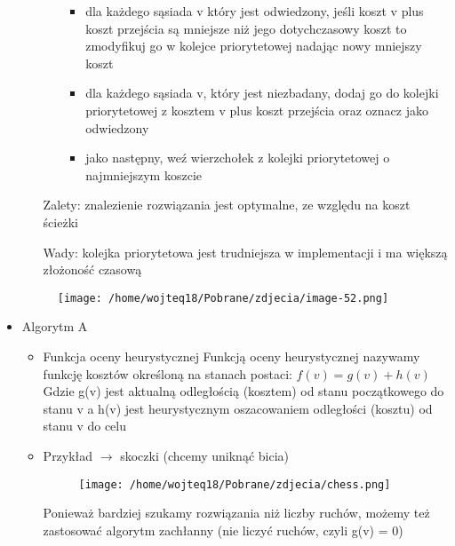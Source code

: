 \documentclass{article}
\begin{document}
\begin{itemize}
\begin{itemize}
\begin{itemize}
\begin{itemize}
                            \item dla każdego sąsiada v który jest odwiedzony, jeśli koszt v plus koszt przejścia są mniejsze niż jego dotychczasowy koszt
                            to zmodyfikuj go w kolejce priorytetowej nadając nowy mniejszy koszt
                            \item dla każdego sąsiada v, który jest niezbadany, dodaj go do kolejki priorytetowej z kosztem v plus koszt przejścia oraz oznacz jako odwiedzony
                            \item jako następny, weź wierzchołek z kolejki priorytetowej o najmniejszym koszcie
                        \end{itemize}
                \end{itemize}
                Zalety: znalezienie rozwiązania jest optymalne, ze względu na koszt ścieżki \par
                Wady: kolejka priorytetowa jest trudniejsza w implementacji i ma większą złożoność czasową
        \end{itemize}
        \begin{figure}[H]
            \centering
            \texttt{[image: /home/wojteq18/Pobrane/zdjecia/image-52.png]}
            \label{fig:dfs_image}
        \end{figure}
    \item Algorytm A
        \begin{itemize}
            \item Funkcja oceny heurystycznej
            Funkcją oceny heurystycznej nazywamy funkcję kosztów określoną na stanach postaci: \newline
            $f(v) = g(v) + h(v)$ \newline
            Gdzie g(v) jest aktualną odległością (kosztem) od stanu początkowego do stanu v \newline
            a h(v) jest heurystycznym oszacowaniem odległości (kosztu) od stanu v do celu
            \item Przykład $\rightarrow$ skoczki (chcemy uniknąć bicia)
            \begin{figure}[H]
                \centering
                \texttt{[image: /home/wojteq18/Pobrane/zdjecia/chess.png]}
                \label{fig:dfs_image}
            \end{figure}
            Ponieważ bardziej szukamy rozwiązania niż liczby ruchów, możemy też zastosować algorytm zachłanny \newline (nie liczyć ruchów, czyli g(v) = 0)

\end{itemize}
\end{itemize}
\end{document}
